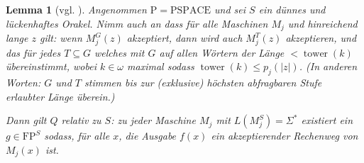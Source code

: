 \documentclass[nofonts]{uebung}
\newtheorem{lemma}[theorem]{Lemma}
\theoremstyle{definition}
\def\P{\ensuremath{\mathrm{P}}}
\def\FP{\ensuremath{\mathrm{FP}}}
\def\PSPACE{\ensuremath{\mathrm{PSPACE}}}
\DeclareMathOperator{\tower}{tower}
\begin{document}
\begin{lemma}[vgl. \cite{fortnow_separability_2002}]\label{thm:q-algorithmus}
    Angenommen $\P=\PSPACE$ und sei $S$ ein dünnes und lückenhaftes Orakel. %
    Nimm auch an dass für alle Maschinen $M_j$ und hinreichend lange $z$ gilt: wenn $M_j^G(z)$ akzeptiert, dann wird auch $M_j^T(z)$ akzeptieren, und das für jedes $T\subseteq G$ welches mit $G$ auf allen Wörtern der Länge $<\tower(k)$ übereinstimmt, wobei $k\in\omega$ maximal sodass $\tower(k)\leq p_j(|z|)$.
    (In anderen Worten: $G$ und $T$ stimmen bis zur (exklusive) höchsten abfragbaren Stufe erlaubter Länge überein.)

    Dann gilt $Q$ relativ zu $S$: zu jeder Maschine $M_j$ mit $L(M_j^S)=\Sigma^*$ existiert ein $g\in\FP^S$ sodass, für alle $x$, die Ausgabe $f(x)$ ein akzeptierender Rechenweg von $M_j(x)$ ist. 
\end{lemma}
\end{document}
